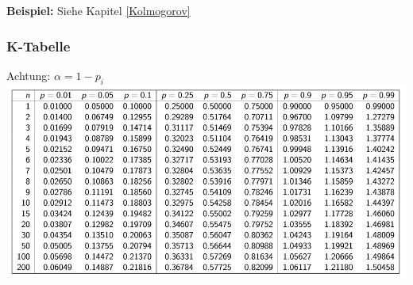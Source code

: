 \textbf{Beispiel:} Siehe Kapitel \ref{Kolmogorov}

\subsubsection{K-Tabelle}
Achtung: $\alpha = 1 - p_i$\\
\includegraphics[width=\columnwidth]{Images/ktabelle}
